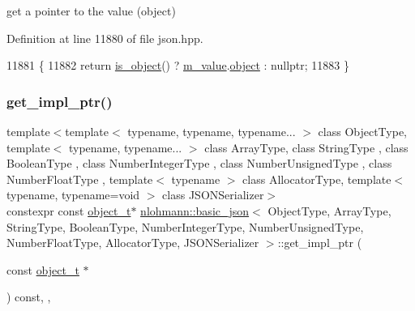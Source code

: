 get a pointer to the value (object) 



Definition at line 11880 of file json.\+hpp.


\begin{DoxyCode}
11881     \{
11882         \textcolor{keywordflow}{return} \hyperlink{classnlohmann_1_1basic__json_af8f511af124e82e4579f444b4175787c}{is\_object}() ? \hyperlink{classnlohmann_1_1basic__json_aeb0814f76966f99290cb29e127c90a77}{m\_value}.\hyperlink{unionnlohmann_1_1basic__json_1_1json__value_a4a2209bb26e7088cd36bf24824ab5521}{object} : \textcolor{keyword}{nullptr};
11883     \}
\end{DoxyCode}
\mbox{\label{classnlohmann_1_1basic__json_aff66aa31ef8603d799433b26fe7535c9}} 
\subsubsection{\texorpdfstring{get\+\_\+impl\+\_\+ptr()}{get\_impl\_ptr()}\hspace{0.1cm}{\footnotesize\ttfamily [2/14]}}
{\footnotesize\ttfamily template$<$template$<$ typename, typename, typename... $>$ class Object\+Type, template$<$ typename, typename... $>$ class Array\+Type, class String\+Type , class Boolean\+Type , class Number\+Integer\+Type , class Number\+Unsigned\+Type , class Number\+Float\+Type , template$<$ typename $>$ class Allocator\+Type, template$<$ typename, typename=void $>$ class J\+S\+O\+N\+Serializer$>$ \\
constexpr const \hyperlink{classnlohmann_1_1basic__json_a5e48a7893520e1314bf0c9723e26ea2a}{object\+\_\+t}$\ast$ \hyperlink{classnlohmann_1_1basic__json}{nlohmann\+::basic\+\_\+json}$<$ Object\+Type, Array\+Type, String\+Type, Boolean\+Type, Number\+Integer\+Type, Number\+Unsigned\+Type, Number\+Float\+Type, Allocator\+Type, J\+S\+O\+N\+Serializer $>$\+::get\+\_\+impl\+\_\+ptr (\begin{DoxyParamCaption}\item[{const \hyperlink{classnlohmann_1_1basic__json_a5e48a7893520e1314bf0c9723e26ea2a}{object\+\_\+t} $\ast$}]{ }\end{DoxyParamCaption}) const\hspace{0.3cm}{\ttfamily [inline]}, {\ttfamily [private]}, {\ttfamily [noexcept]}}



